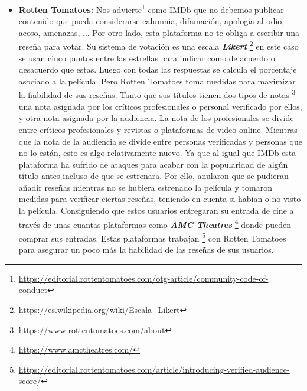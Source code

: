 \begin{itemize}
\item \textbf{Rotten Tomatoes:} Nos advierte\footnote{\url{https://editorial.rottentomatoes.com/otg-article/community-code-of-conduct}} como IMDb que no debemos publicar contenido que pueda considerarse calumnia, difamación, apología al odio, acoso, amenazas, ... Por otro lado, esta plataforma no te obliga a escribir una reseña para votar. Su sistema de votación es una escala \textbf{\textit{Likert}} \footnote{\url{https://es.wikipedia.org/wiki/Escala_Likert}} en este caso se usan cinco puntos entre las estrellas para indicar como de acuerdo o desacuerdo que estas. Luego con todas las respuestas se calcula el porcentaje asociado a la película. Pero Rotten Tomatoes toma medidas para maximizar la fiabilidad de sus reseñas. Tanto que sus títulos tienen dos tipos de notas \footnote{\url{https://www.rottentomatoes.com/about}} una nota asignada por los críticos profesionales o personal verificado por ellos, y otra nota asignada por la audiencia. La nota de los profesionales se divide entre críticos profesionales y revistas o plataformas de video online. Mientras que la nota de la audiencia se divide entre personas verificadas y personas que no lo están, esto es algo relativamente nuevo. Ya que al igual que IMDb esta plataforma ha sufrido de ataques para acabar con la popularidad de algún título antes incluso de que se estrenara. Por ello, anularon que se pudieran añadir reseñas mientras no se hubiera estrenado la película y tomaron medidas para verificar ciertas reseñas, teniendo en cuenta si habían o no visto la película. Consiguiendo que estos usuarios entregaran su entrada de cine a través de unas cuantas plataformas como  \textbf{\textit{AMC Theatres}} \footnote{\url{https://www.amctheatres.com/}} donde pueden comprar sus entradas. Estas plataformas trabajan \footnote{\url{https://editorial.rottentomatoes.com/article/introducing-verified-audience-score/}} con Rotten Tomatoes para asegurar un poco más la fiabilidad de las reseñas de sus usuarios.

\end{itemize}
